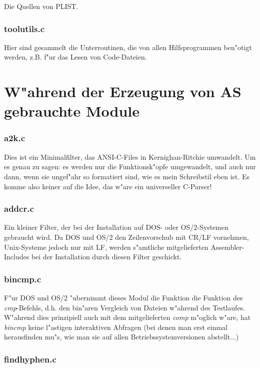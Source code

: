 \documentclass[12pt,a4paper,twoside]{report}
\begin{document}
{Die Quellen von PLIST.

\subsubsection{toolutils.c}

Hier sind gesammelt die Unterroutinen, die von allen Hilfsprogrammen
ben"otigt werden, z.B. f"ur das Lesen von Code-Dateien.

\section{W"ahrend der Erzeugung von AS gebrauchte Module}

\subsubsection{a2k.c}

Dies ist ein Minimalfilter, das ANSI-C-Files in Kernighan-Ritchie
umwandelt.  Um es genau zu sagen: es werden nur die Funktionsk"opfe
umgewandelt, und auch nur dann, wenn sie ungef"ahr so formatiert sind, wie
es mein Schreibstil eben ist.  Es komme also keiner auf die Idee, das
w"are ein universeller C-Parser!

\subsubsection{addcr.c}

Ein kleiner Filter, der bei der Installation auf DOS- oder OS/2-Systemen
gebraucht wird.  Da DOS und OS/2 den Zeilenvorschub mit CR/LF vornehmen,
Unix-Systeme jedoch nur mit LF, werden s"amtliche mitgelieferten
Assembler-Includes bei der Installation durch diesen Filter geschickt.

\subsubsection{bincmp.c}

F"ur DOS und OS/2 "ubernimmt dieses Modul die Funktion die Funktion des
{\em cmp}-Befehls, d.h. den bin"aren Vergleich von Dateien w"ahrend des
Testlaufes.  W"ahrend dies prinzipiell auch mit dem mitgelieferten {\em
comp} m"oglich w"are, hat {\em bincmp} keine l"astigen interaktiven
Abfragen (bei denen man erst einmal herausfinden mu"s, wie man sie auf
allen Betriebssystemversionen abstellt...)

\subsubsection{findhyphen.c}

}
\end{document}
